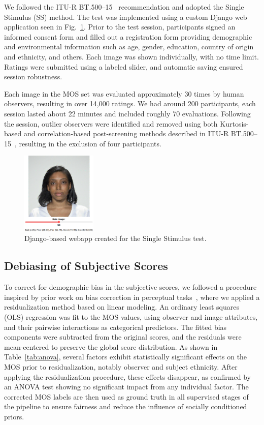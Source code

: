 We followed the ITU-R BT.500--15~\cite{ITU-R-BT500} recommendation and adopted the Single Stimulus (SS) method. The test was implemented using a custom Django web application seen in Fig.~\ref{fig:webapp}. Prior to the test session, participants signed an informed consent form and filled out a registration form providing demographic and environmental information such as age, gender, education, country of origin and ethnicity, and others. Each image was shown individually, with no time limit. Ratings were submitted using a labeled slider, and automatic saving ensured session robustness.

Each image in the MOS set was evaluated approximately 30 times by human observers, resulting in over 14,000 ratings. We had around 200 participants, each session lasted about 22 minutes and included roughly 70 evaluations. Following the session, outlier observers were identified and removed using both Kurtosis-based and correlation-based post-screening methods described in ITU-R BT.500--15~\cite{ITU-R-BT500}, resulting in the exclusion of four participants.

\begin{figure}
    \centering
    \includegraphics[width=0.32\textwidth]{images/webapp_test.png}
    \caption{Django-based webapp created for the Single Stimulus test.}\label{fig:webapp}
\end{figure}

\subsection{Debiasing of Subjective Scores}

To correct for demographic bias in the subjective scores, we followed a procedure inspired by prior work on bias correction in perceptual tasks~\cite{clapes2018apparent}, where we applied a residualization method based on linear modeling. An ordinary least squares (OLS) regression was fit to the MOS values, using observer and image attributes, and their pairwise interactions as categorical predictors. The fitted bias components were subtracted from the original scores, and the residuals were mean-centered to preserve the global score distribution. As shown in Table~\ref{tab:anova}, several factors exhibit statistically significant effects on the MOS prior to residualization, notably observer and subject ethnicity. After applying the residualization procedure, these effects disappear, as confirmed by an ANOVA test showing no significant impact from any individual factor. The corrected MOS labels are then used as ground truth in all supervised stages of the pipeline to ensure fairness and reduce the influence of socially conditioned priors.

